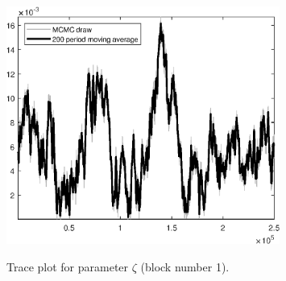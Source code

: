 \begin{figure}[H]
\centering
  \includegraphics[width=0.8\textwidth]{BRS_growth_ext_util/graphs/TracePlot_zeta_blck_1}\\
    \caption{Trace plot for parameter ${\zeta}$ (block number 1).}
\end{figure}

